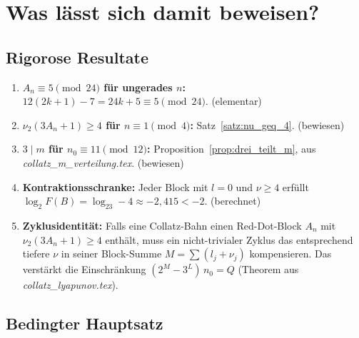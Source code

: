 \documentclass[12pt,a4paper]{article}
\newcommand{\vii}{\nu_2}
\newcommand{\logt}{\log_2}
\begin{document}
\section{Was lässt sich damit beweisen?}
\label{sec:beweise}

\subsection{Rigorose Resultate}

\begin{tcolorbox}[ergebnis, title={Bewiesene Aussagen}]
\begin{enumerate}[label=\upshape(\arabic*), leftmargin=*]
  \item \textbf{$A_n \equiv 5 \pmod{24}$ für ungerades $n$:}
    $12(2k+1) - 7 = 24k+5 \equiv 5 \pmod{24}$. (elementar)

  \item \textbf{$\vii(3A_n+1) \geq 4$ für $n \equiv 1 \pmod{4}$:}
    Satz~\ref{satz:nu_geq_4}. (bewiesen)

  \item \textbf{$3 \mid m$ für $n_0 \equiv 11 \pmod{12}$:}
    Proposition~\ref{prop:drei_teilt_m}, aus \textit{collatz\_m\_verteilung.tex}. (bewiesen)

  \item \textbf{Kontraktionsschranke:}
    Jeder Block mit $l=0$ und $\nu \geq 4$ erfüllt
    $\logt F(B) = \logt 3 - 4 \approx -2{,}415 < -2$. (berechnet)

  \item \textbf{Zyklusidentität:}
    Falls eine Collatz-Bahn einen Red-Dot-Block $A_n$ mit $\vii(3A_n+1)\geq 4$
    enthält, muss ein nicht-trivialer Zyklus das entsprechend tiefere $\nu$
    in seiner Block-Summe $M = \sum(l_j + \nu_j)$ kompensieren.
    Das verstärkt die Einschränkung $(2^M - 3^L)\,n_0 = Q$
    (Theorem aus \textit{collatz\_lyapunov.tex}).
\end{enumerate}
\end{tcolorbox}

\subsection{Bedingter Hauptsatz}
\end{document}

